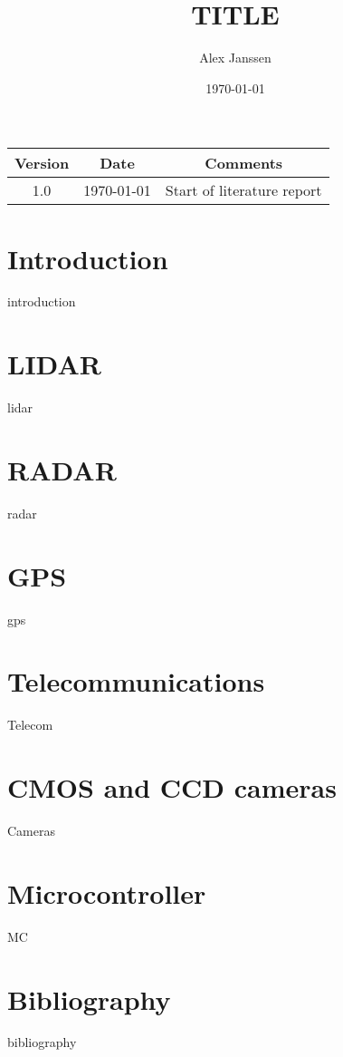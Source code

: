 \documentclass[parskip=full,11pt,a4paper,titlepage]{article}
\title{TITLE}
\author{Alex Janssen}
\date{\today}
\begin{document}



\clearpage

\begin{center}
\begin{tabular}{|c|c|c|}
\hline
	Version	& Date & Comments \\
\hline
	1.0		& \today & Start of literature report \\
\hline
\end{tabular}
\end{center}
\clearpage



\tableofcontents
\clearpage

\section{Introduction}
{introduction}
\clearpage

\section{LIDAR}
{lidar}
\clearpage

\section{RADAR}
{radar}

\section{GPS}
{gps}
\clearpage

\section{Telecommunications}
{Telecom}
\clearpage

\section{CMOS and CCD cameras}
{Cameras}
\clearpage

\section{Microcontroller}
{MC}
\clearpage

\section{Bibliography}
{bibliography}










\end{document}
